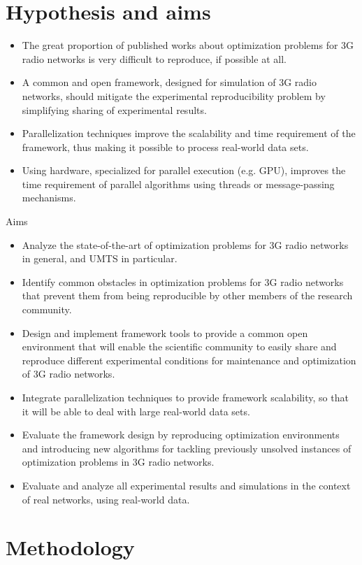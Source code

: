 \section{Hypothesis and aims}
\begin{itemize}
\item The great proportion of published works about optimization problems
for 3G radio networks is very difficult to reproduce, if possible
at all.
\item A common and open framework, designed for simulation of 3G radio networks,
should mitigate the experimental reproducibility problem by simplifying
sharing of experimental results.
\item Parallelization techniques improve the scalability and time requirement
of the framework, thus making it possible to process real-world data
sets.
\item Using hardware, specialized for parallel execution (e.g. GPU), improves
the time requirement of parallel algorithms using threads or message-passing
mechanisms.
\end{itemize}
Aims
\begin{itemize}
\item Analyze the state-of-the-art of optimization problems for 3G radio
networks in general, and UMTS in particular.
\item Identify common obstacles in optimization problems for 3G radio networks
that prevent them from being reproducible by other members of the
research community.
\item Design and implement framework tools to provide a common open environment
that will enable the scientific community to easily share and reproduce
different experimental conditions for maintenance and optimization
of 3G radio networks.
\item Integrate parallelization techniques to provide framework scalability,
so that it will be able to deal with large real-world data sets.
\item Evaluate the framework design by reproducing optimization environments
and introducing new algorithms for tackling previously unsolved instances
of optimization problems in 3G radio networks.
\item Evaluate and analyze all experimental results and simulations in the
context of real networks, using real-world data.
\end{itemize}

\section{Methodology}

